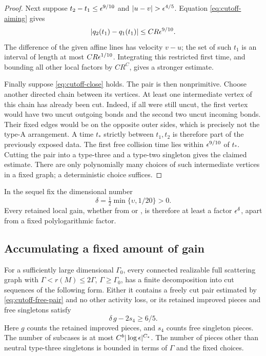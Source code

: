 \begin{proof}
Next suppose \(t_2-t_1\leq\epsilon^{9/10}\) and
\(|u-v|>\eps^{4/5}\).
Equation \eqref{eq:cutoff-aiming} gives
\[
 |q_2(t_1)-q_1(t_1)|\leq CR\epsilon^{9/10}.
\]
The difference of the given affine lines has velocity \(v-u\);
the set of such \(t_1\) is an interval of length at most
\(CR\epsilon^{1/10}\).  Integrating this restricted first time,
and bounding all other local factors by \(CR^C\), gives a
stronger estimate.

Finally suppose \eqref{eq:cutoff-close} holds.  The pair is then
nonprimitive.  Choose another directed chain between its vertices.
At least one intermediate vertex of this chain has already been
cut.  Indeed, if all were still uncut, the first vertex would have
two uncut outgoing bonds and the second two uncut incoming bonds.
Their fixed edges would be on the opposite outer sides, which is
precisely not the type-A arrangement.  A time \(t_*\) strictly
between \(t_1,t_2\) is therefore part of the previously exposed
data.  The first free collision time lies within
\(\epsilon^{9/10}\) of \(t_*\).  Cutting the pair into a type-three
and a type-two singleton gives the claimed estimate.
There are only polynomially many choices of such intermediate
vertices in a fixed graph; a deterministic choice suffices.
\end{proof}

In the sequel fix the dimensional number
\begin{equation}\label{eq:cutoff-delta}
 \delta=\tfrac12\min\{\upsilon,1/20\}>0.
\end{equation}
Every retained local gain, whether from
 or , is therefore
at least a factor \(\epsilon^\delta\), apart from a fixed
polylogarithmic factor.

\subsection{Accumulating a fixed amount of gain}

\begin{lemma}\label{lem:cutoff-amplified}
For a sufficiently large dimensional \(\Gamma_0\), every connected
realizable full scattering graph with
\(\Gamma<r(M)\leq2\Gamma\), \(\Gamma\geq\Gamma_0\), has a
finite decomposition into cut sequences of the following form.
Either it contains a freely cut pair estimated by
\eqref{eq:cutoff-free-pair} and no other activity loss, or its
retained improved pieces and free singletons satisfy
\begin{equation}\label{eq:cutoff-gain-balance}
 \delta\,g-2s_4\geq6/5 .
\end{equation}
Here \(g\) counts the retained improved pieces, and \(s_4\)
counts free singleton pieces.  The number of subcases is at most
\(C^b|\log\epsilon|^{C_*}\).  The number of pieces other than
neutral type-three singletons is bounded in terms of \(\Gamma\)
and the fixed choices.
\end{lemma}

